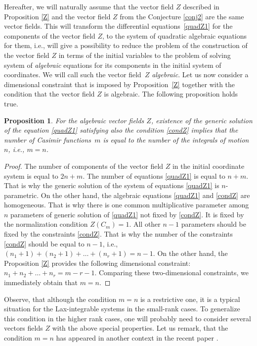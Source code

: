 \documentclass[10pt,a4paper]{amsart}
\numberwithin{equation}{section}
\newtheorem{Proposition}[Theorem]{Proposition}
\begin{document}
Hereafter, we will naturally assume that the vector field $Z$ described in Proposition \ref{Z} and the vector field $Z$ from the Conjecture \ref{conj2} are the same vector fields. This will transform the differential equations~\eqref{quadZ1} for the components of the vector field $Z$, to the system of quadratic algebraic equations for them, i.e., will give a possibility to reduce the problem of the construction of the vector field $Z$ in terms of the initial variables to the problem of solving system of {\it algebraic} equations for its components in the initial system of coordinates. We will call such the vector field~$Z$ {\it algebraic}.
Let us now consider a dimensional constraint that is imposed by Proposition~\ref{Z} together with the condition that the vector field $Z$ is algebraic.
The following proposition holds true.
\begin{Proposition}
For the algebraic vector fields $Z$, existence of the generic solution of the equation \eqref{quadZ1} satisfying also the condition \eqref{condZ} implies that the number of Casimir functions~$m$ is equal to the number of the integrals of motion $n$, i.e., $m=n$.
\end{Proposition}

\begin{proof}
 The number of components of the vector field $Z$ in the initial coordinate system is equal to $2n+m$. The number of equations \eqref{quadZ1} is equal to $n+m$. That is why the generic solution of the system of equations \eqref{quadZ1} is $n$-parametric. On the other hand, the algebraic equations \eqref{quadZ1} and \eqref{condZ} are homogeneous. That is why there is one common multiplicative parameter among $n$ parameters of generic solution of \eqref{quadZ1} not fixed by \eqref{condZ}. It is fixed by the normalization condition $Z(C_m)=1$. All other $n-1$ parameters should be fixed by the constraints \eqref{condZ}. That is why the number of the constraints \eqref{condZ} should be equal to $n-1$, i.e., $(n_1+1)+ (n_2+1)+ \dots +(n_r+1)=n-1$. On the other hand, the Proposition \ref{Z} provides the following dimensional constraint: $n_1+n_2+ \dots +n_r=m-r-1$.
Comparing these two-dimensional constraints, we immediately obtain that $m=n$.
\end{proof}

\begin{Remark}
 Observe, that although the condition $m=n$ is a restrictive one, it is a typical situation for the Lax-integrable systems in the small-rank cases. To generalize this condition in the higher rank cases, one will probably need to consider several vectors fields $Z$ with the above special properties. Let us remark, that the condition $m=n$ has appeared in another context in the recent paper \cite{BlaMar}.
\end{Remark}
\end{document}
